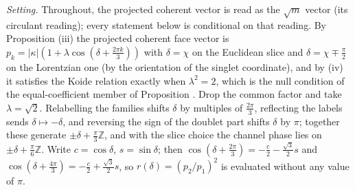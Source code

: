 \emph{Setting.} Throughout, the projected coherent vector is read as the $\sqrt{m}$ vector (its circulant reading); every statement below is conditional on that reading. By Proposition (iii) the projected coherent face vector is $p_{k} = |\kappa|(1 + \lambda\cos(\delta + \tfrac{2\pi k}{3}))$ with $\delta = \chi$ on the Euclidean slice and $\delta = \chi \mp \tfrac{\pi}{2}$ on the Lorentzian one (by the orientation of the singlet coordinate), and by (iv) it satisfies the Koide relation exactly when $\lambda^{2} = 2$, which is the null condition of the equal-coefficient member of Proposition . Drop the common factor and take $\lambda = \sqrt2$. Relabelling the families shifts $\delta$ by multiples of $\tfrac{2\pi}{3}$, reflecting the labels sends $\delta \mapsto -\delta$, and reversing the sign of the doublet part shifts $\delta$ by $\pi$; together these generate $\pm\delta + \tfrac{\pi}{3}\mathbb{Z}$, and with the slice choice the channel phase lies on $\pm\delta + \tfrac{\pi}{6}\mathbb{Z}$. Write $c = \cos\delta$, $s = \sin\delta$; then $\cos(\delta + \tfrac{2\pi}{3}) = -\tfrac{c}{2} - \tfrac{\sqrt3}{2}s$ and $\cos(\delta + \tfrac{4\pi}{3}) = -\tfrac{c}{2} + \tfrac{\sqrt3}{2}s$, so $r(\delta) = (p_{2}/p_{1})^{2}$ is evaluated without any value of $\pi$.

